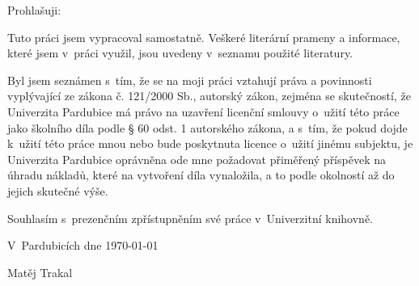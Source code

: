\normalsize
\noindent Prohlašuji:
\vspace{12pt}

Tuto práci jsem vypracoval samostatně. Veškeré literární prameny a informace, které jsem v~práci využil, jsou uvedeny v~seznamu použité literatury.
\vspace{12pt}

Byl jsem seznámen s~tím, že se na moji práci vztahují práva a povinnosti vyplývající ze zákona č. 121/2000 Sb., autorský zákon, zejména se skutečností, že Univerzita Pardubice má právo na uzavření licenční smlouvy o~užití této práce jako školního díla podle § 60 odst. 1 autorského zákona, a s~tím, že pokud dojde k~užití této práce mnou nebo bude poskytnuta licence o~užití jinému subjektu, je Univerzita Pardubice oprávněna ode mne požadovat přiměřený příspěvek na úhradu nákladů, které na vytvoření díla vynaložila, a to podle okolností až do jejich skutečné výše.
\vspace{12pt}

Souhlasím s~prezenčním zpřístupněním své práce v~Univerzitní knihovně.
\vspace{12pt}

V~Pardubicích dne \today

\vspace{24pt}
\begin{flushright}
Matěj Trakal
\end{flushright}

\newpage